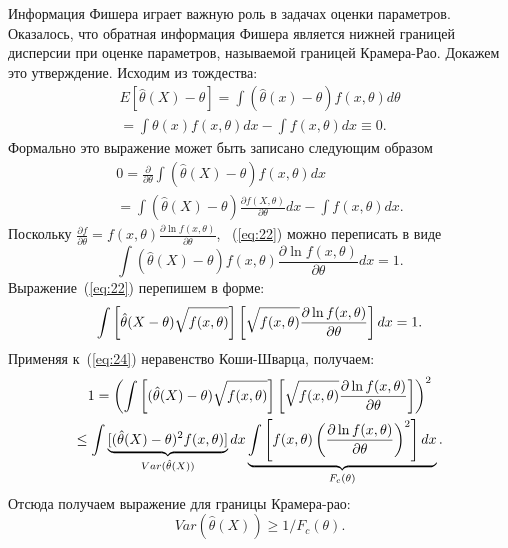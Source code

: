 Информация Фишера играет важную роль в задачах оценки параметров.
Оказалось, что обратная информация Фишера является нижней границей дисперсии при оценке параметров, называемой границей Крамера-Рао.
Докажем это утверждение.
%
Исходим из тождества:
%
\begin{multline}
    \label{eq:21}
        E[\hat{\theta}(X) - \theta] =
            \int(\hat{\theta}(x) - \theta)f(x,\theta)d\theta \\
                = \int\theta(x)f(x,\theta)dx - \int f(x,\theta)dx \equiv 0.
\end{multline}
%
Формально это выражение может быть записано следующим образом
%
\begin{multline}
    \label{eq:22}
        0 = \frac{\partial}{\partial \theta}
            \int(\hat{\theta}(X) - \theta)f(x,\theta)dx \\
                = \int(\hat{\theta}(X) - \theta)
            \frac{\partial f(X, \theta)}{\partial \theta}dx -
        \int f(x,\theta)dx.
\end{multline}
%
Поскольку $\frac{\partial f}{\partial \theta} = f(x,\theta)
    \frac{\partial \ln f(x,\theta)}{\partial \theta}$,
~(\ref{eq:22}) можно переписать в виде
%
\begin{equation}
    \label{eq:23}
        \int(\hat{\theta}(X) - \theta)
            f(x,\theta) \frac{\partial \ln f(x,\theta)}
        {\partial \theta}dx = 1.
\end{equation}
%
Выражение~(\ref{eq:22}) перепишем в форме:
%
\begin{equation}
    \label{eq:24}
        \int \left[\hat{\theta}(X-\theta)\Large \sqrt{\mathstrut f(x,\theta)}\right]
            \left[\Large\sqrt{\mathstrut f(x,\theta)}
                \frac{\partial \ln f(x,\theta)}{\partial \theta}\right]dx = 1.
\end{equation}
%
Применяя к~(\ref{eq:24}) неравенство Коши-Шварца, получаем:
%
\begin{multline}
    \label{eq:25}
        1 = \left(\int \left[(\hat{\theta}(X)-\theta)
            \Large \sqrt{\mathstrut f(x,\theta)}\right]
                \left[\Large \sqrt{\mathstrut f(x,\theta)}
                    \frac{\partial \ln f(x,\theta)}{\partial \theta} \right]
                \right)^2 \\
                \leq \int
            \underbrace{[(\hat{\theta}(X) - \theta)^2 f(x,\theta)]}_{Var(\hat{\theta}(X))}dx
        \underbrace{\int\left[f(x,\theta)\left(\frac{\partial \ln f(x,\theta)}
    {\partial \theta}\right)^2 \right]dx}_{F_c(\theta)}.
\end{multline}
%
Отсюда получаем выражение для границы Крамера-рао:
%
\begin{equation}
    \label{eq:26}
        Var(\hat{\theta}(X)) \geq 1/{F_c (\theta)}.
\end{equation}




